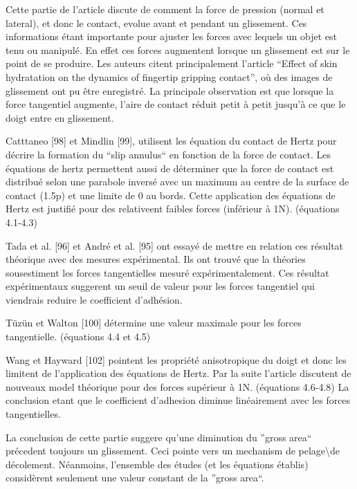 \documentclass[../main.tex]{subfiles}
\begin{document}
Cette partie de l'article discute de comment la force de pression (normal et lateral), et donc le contact, evolue avant et pendant un glissement. 
Ces informations \'etant importante pour ajuster les forces avec lequels un objet est tenu ou manipul\'e. 
En effet ces forces augmentent lorsque un glissement est sur le point de se produire.
Les auteurs citent principalement l'article ``Effect of skin hydratation on the dynamics of fingertip gripping contact'',
où des images de glissement ont pu être enregistr\'e.
La principale observation est que lorsque la force tangentiel augmente, l'aire de contact r\'eduit petit à petit jusqu'à ce que le doigt entre en glissement.

Catttaneo [98] et Mindlin [99], utilisent les \'equation du contact de Hertz pour d\'ecrire la formation du ``slip annulus`` en fonction de la force de contact. 
Les \'equations de hertz permettent aussi de d\'eterminer que la force de contact est distribu\'e selon une parabole invers\'e avec un maximum au centre de la surface de contact (1.5p) et une limite de 0 au bords.
Cette application des \'equations de Hertz est justifi\'e pour des relativeent faibles forces (inf\'erieur à 1N).
(\'equations 4.1-4.3)

Tada et al. [96] et Andr\'e et al. [95] ont essay\'e de mettre en relation ces r\'esultat th\'eorique avec des mesures exp\'erimental. 
Ils ont trouv\'e que la th\'eories sousestiment les forces tangentielles mesur\'e exp\'erimentalement.
Ces r\'esultat exp\'erimentaux suggerent un seuil de valeur pour les forces tangentiel qui viendrais reduire le coefficient d'adh\'esion.

Tüzün et Walton [100] d\'etermine une valeur maximale pour les forces tangentielle. 
(\'equations 4.4 et 4.5)

Wang et Hayward [102] pointent les propri\'et\'e anisotropique du doigt et donc les limitent de l'application des \'equations de Hertz.
Par la suite l'article discutent de nouveaux model th\'eorique pour des forces sup\'erieur à 1N. 
(\'equations 4.6-4.8)
La conclusion etant que le coefficient d'adhesion diminue lin\'eairement avec les forces tangentielles.

La conclusion de cette partie suggere qu'une diminution du ''gross area`` pr\'ecedent toujours un glissement. 
Ceci pointe vers un mechanism de pelage\textbackslash de d\'ecolement.
N\'eanmoins, l'ensemble des \'etudes (et les \'equations \'etablis) considèrent seulement une valeur constant de la ''gross area``.
\end{document}
